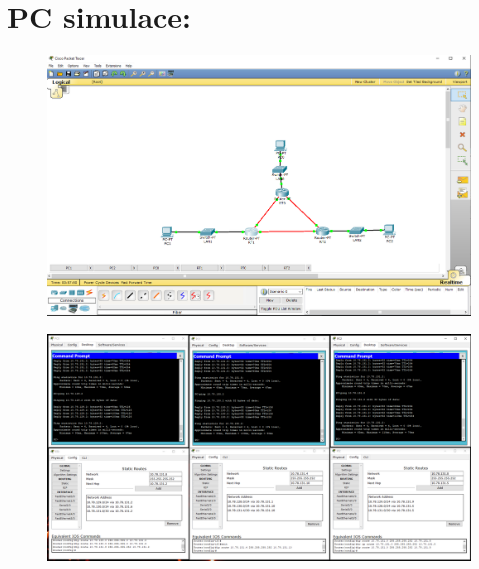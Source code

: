 \documentclass[10pt, a4paper]{article}%
\begin{document}
\section*{PC simulace:}
\begin{figure}[ht!]
    \centering
    \includegraphics[width = 1\textwidth]{CISCO_diag.PNG}
\end{figure}	

\begin{figure}[ht!]
    \centering
    \includegraphics[width = 1\textwidth]{CISCO_config.PNG}
\end{figure}	

\clearpage
\end{document}
